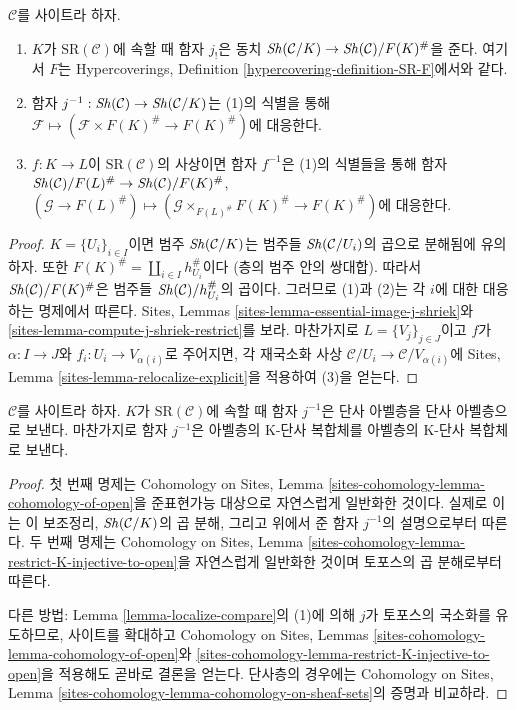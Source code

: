 \begin{lemma}
\label{lemma-localize-compare}
$\mathcal{C}$를 사이트라 하자.
\begin{enumerate}
\item $K$가 $\text{SR}(\mathcal{C})$에 속할 때 함자 $j_!$은 동치
$\mathop{\mathit{Sh}}\nolimits(\mathcal{C}/K) \to \mathop{\mathit{Sh}}\nolimits(\mathcal{C})/F(K)^\#$을 준다.
여기서 $F$는 Hypercoverings, Definition
\ref{hypercovering-definition-SR-F}에서와 같다.
\item 함자 $j^{-1} : \mathop{\mathit{Sh}}\nolimits(\mathcal{C}) \to \mathop{\mathit{Sh}}\nolimits(\mathcal{C}/K)$는
(1)의 식별을 통해
$\mathcal{F} \mapsto (\mathcal{F} \times F(K)^\# \to F(K)^\#)$에
대응한다.
\item $f : K \to L$이 $\text{SR}(\mathcal{C})$의 사상이면
함자 $f^{-1}$은 (1)의 식별들을 통해 함자
$\mathop{\mathit{Sh}}\nolimits(\mathcal{C})/F(L)^\# \to \mathop{\mathit{Sh}}\nolimits(\mathcal{C})/F(K)^\#$,
$(\mathcal{G} \to F(L)^\#) \mapsto
(\mathcal{G} \times_{F(L)^\#} F(K)^\# \to F(K)^\#)$에 대응한다.
\end{enumerate}
\end{lemma}

\begin{proof}
$K = \{U_i\}_{i \in I}$이면 범주 $\mathop{\mathit{Sh}}\nolimits(\mathcal{C}/K)$는
범주들 $\mathop{\mathit{Sh}}\nolimits(\mathcal{C}/U_i)$의 곱으로 분해됨에 유의하자.
또한 $F(K)^\# = \coprod_{i \in I} h_{U_i}^\#$이다
(층의 범주 안의 쌍대합).
따라서 $\mathop{\mathit{Sh}}\nolimits(\mathcal{C})/F(K)^\#$은 범주들
$\mathop{\mathit{Sh}}\nolimits(\mathcal{C})/h_{U_i}^\#$의 곱이다.
그러므로 (1)과 (2)는 각 $i$에 대한 대응하는 명제에서 따른다.
Sites, Lemmas \ref{sites-lemma-essential-image-j-shriek}와
\ref{sites-lemma-compute-j-shriek-restrict}를 보라.
마찬가지로 $L = \{V_j\}_{j \in J}$이고 $f$가
$\alpha : I \to J$와 $f_i : U_i \to V_{\alpha(i)}$로 주어지면,
각 재국소화 사상
$\mathcal{C}/U_i \to \mathcal{C}/V_{\alpha(i)}$에
Sites, Lemma \ref{sites-lemma-relocalize-explicit}을 적용하여 (3)을 얻는다.
\end{proof}

\begin{lemma}
\label{lemma-localize-injective}
$\mathcal{C}$를 사이트라 하자. $K$가 $\text{SR}(\mathcal{C})$에 속할 때
함자 $j^{-1}$은 단사 아벨층을 단사 아벨층으로 보낸다.
마찬가지로 함자 $j^{-1}$은 아벨층의 K-단사 복합체를
아벨층의 K-단사 복합체로 보낸다.
\end{lemma}

\begin{proof}
첫 번째 명제는 Cohomology on Sites, Lemma
\ref{sites-cohomology-lemma-cohomology-of-open}을
준표현가능 대상으로 자연스럽게 일반화한 것이다.
실제로 이는 이 보조정리, $\mathop{\mathit{Sh}}\nolimits(\mathcal{C}/K)$의 곱 분해,
그리고 위에서 준 함자 $j^{-1}$의 설명으로부터 따른다.
두 번째 명제는 Cohomology on Sites, Lemma
\ref{sites-cohomology-lemma-restrict-K-injective-to-open}을
자연스럽게 일반화한 것이며 토포스의 곱 분해로부터 따른다.

\medskip\noindent
다른 방법: Lemma \ref{lemma-localize-compare}의 (1)에 의해
$j$가 토포스의 국소화를 유도하므로, 사이트를 확대하고
Cohomology on Sites, Lemmas
\ref{sites-cohomology-lemma-cohomology-of-open}와
\ref{sites-cohomology-lemma-restrict-K-injective-to-open}을 적용해도
곧바로 결론을 얻는다. 단사층의 경우에는 Cohomology on Sites, Lemma
\ref{sites-cohomology-lemma-cohomology-on-sheaf-sets}의 증명과 비교하라.
\end{proof}

